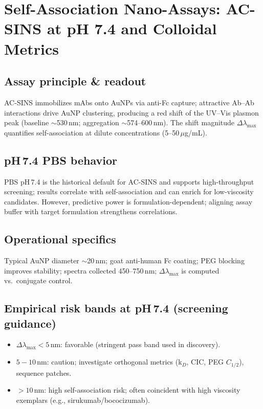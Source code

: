 \section*{Self-Association Nano-Assays: AC-SINS at pH 7.4 and Colloidal Metrics}

\subsection*{Assay principle \& readout}
AC-SINS immobilizes mAbs onto AuNPs via anti-Fc capture; attractive Ab–Ab interactions drive AuNP clustering, producing a red shift of the UV–Vis plasmon peak (baseline \(\sim\)530\,nm; aggregation \(\sim\)574–600\,nm). The shift magnitude \(\Delta\lambda_{\max}\) quantifies self-association at dilute concentrations (5–50\,\(\mu\)g/mL). \cite{Liu2013,Phan2022,Geng2016_MolPharm}

\subsection*{pH\,7.4 PBS behavior}
PBS pH\,7.4 is the historical default for AC-SINS and supports high-throughput screening; results correlate with self-association and can enrich for low-viscosity candidates. However, predictive power is formulation-dependent; aligning assay buffer with target formulation strengthens correlations. \cite{Liu2013,Phan2022,Avery2018,Jain2017}

\subsection*{Operational specifics}
Typical AuNP diameter \(\sim\)20\,nm; goat anti-human Fc coating; PEG blocking improves stability; spectra collected 450–750\,nm; \(\Delta\lambda_{\max}\) is computed vs.\ conjugate control. \cite{Geng2016_Bioconj,Phan2022,WO2018035470}

\subsection*{Empirical risk bands at pH\,7.4 (screening guidance)}
\begin{itemize}\setlength\itemsep{2pt}
\item \(\Delta\lambda_{\max} < 5\,\mathrm{nm}\): favorable (stringent pass band used in discovery). \cite{Liu2013,Wu2015,VanDeLavoir2024}
\item \(5\!-\!10\,\mathrm{nm}\): caution; investigate orthogonal metrics (k\(_D\), CIC, PEG \(C_{1/2}\)), sequence patches.
\item \(>10\,\mathrm{nm}\): high self-association risk; often coincident with high viscosity exemplars (e.g., sirukumab/bococizumab). \cite{Ferrara2022,Jain2017}
\end{itemize}


